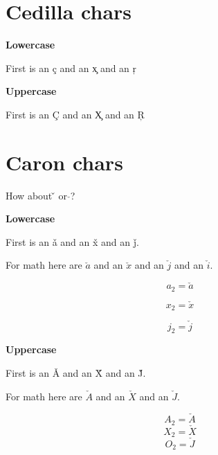 \documentclass{article}
\begin{document}
\section{Cedilla chars}
\textbf{Lowercase}

First is an \c{c} and an \c{x} and an \c{r}

\textbf{Uppercase}

First is an \c{C} and an \c{X} and an \c{R}




\section{Caron chars}

How about \v{} or $\check{}$? 

\textbf{Lowercase}

First is an \v{a} and an \v{x} and an \v{j}.

For math here are $\check{a}$ and an $\check{x}$ and an $\check{j}$  and an $\check{i}$.

$$a_2=\check{a}$$

$$x_2=\check{x}$$

$$j_2=\check{j}$$

\textbf{Uppercase}

First is an \v{A} and an \v{X} and an \v{J}.

For math here are $\check{A}$ and an $\check{X}$ and an $\check{J}$.

$$A_2=\check{A}$$
$$X_2=\check{X}$$
$$O_2=\check{J}$$
\end{document}
